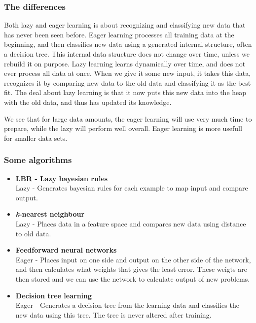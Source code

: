 \documentclass[english,a4paper]{article}
\begin{document}
\subsubsection{The differences}
Both lazy and eager learning is about recognizing and classifying new data that
has never been seen before. Eager learning processes all training data at the
beginning, and then classifies new data using a generated internal structure,
often a decision tree. This internal data structure does not change over time,
unless we rebuild it on purpose. Lazy learning learns dynamically over time, and
does not ever process all data at once. When we give it some new input, it takes
this data, recognizes it by comparing new data to the old data and classifying
it as the best fit. The deal about lazy learning is that it now puts this new
data into the heap with the old data, and thus has updated its knowledge.

We see that for large data amounts, the eager learning will use very much time
to prepare, while the lazy will perform well overall. Eager learning is more
usefull for smaller data sets.

\subsubsection{Some algorithms}
\begin{itemize}
  \item \textbf{LBR - Lazy bayesian rules}\\
  Lazy - Generates bayesian rules for each example to map input and compare
  output.
  \item \textbf{\emph{k}-nearest neighbour}\\
  Lazy - Places data in a feature space and compares new data using distance to
  old data.
  \item \textbf{Feedforward neural networks}\\
  Eager - Places input on one side and output on the other side of the network,
  and then calculates what weights that gives the least error. These weigts are
  then stored and we can use the network to calculate output of new problems.
  \item \textbf{Decision tree learning}\\
  Eager - Generates a decision tree from the learning data and classifies the
  new data using this tree. The tree is never altered after training. 
\end{itemize}
\end{document}
